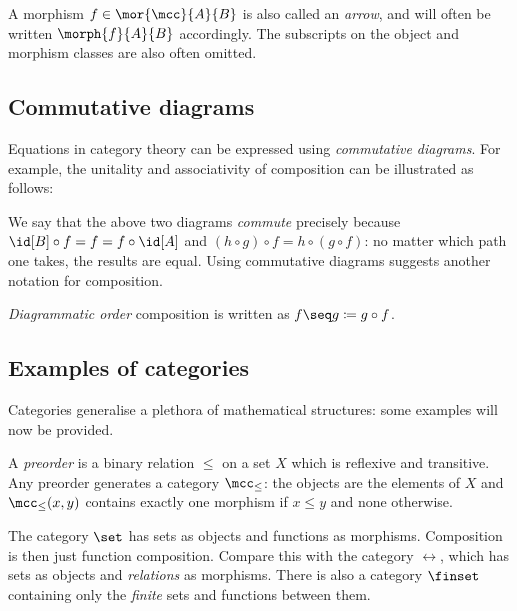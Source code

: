 A morphism \(f \in \mor{\mcc}{A}{B}\) is also called an \emph{arrow}, and will
often be written \(\morph{f}{A}{B}\) accordingly.
The subscripts on the object and morphism classes are also often omitted.

\subsection{Commutative diagrams}

Equations in category theory can be expressed using \emph{commutative diagrams}.
For example, the unitality and associativity of composition can be illustrated
as follows:

\begin{center}
    
    \quad
    
\end{center}

We say that the above two diagrams \emph{commute} precisely because \(
    \id[B] \circ f = f = f \circ \id[A]
\) and \((h \circ g) \circ f = h \circ (g \circ f)\): no matter which path one
takes, the results are equal.
Using commutative diagrams suggests another notation for composition.

\begin{notation}
    \emph{Diagrammatic order} composition is written as
    \(f \seq g \coloneqq g \circ f\).
\end{notation}

\subsection{Examples of categories}

Categories generalise a plethora of mathematical structures: some examples will
now be provided.

\begin{example}[Preorder]
    A \emph{preorder} is a binary relation \(\leq\) on a set \(X\) which is
    reflexive and transitive.
    Any preorder generates a category \(\mcc_\leq\): the objects are the
    elements of \(X\) and \(\mcc_\leq(x, y)\) contains exactly one morphism if
    \(x \leq y\) and none otherwise.
\end{example}

\begin{example}[Sets]
    The category \(\set\) has sets as objects and functions as morphisms.
    Composition is then just function composition.
    Compare this with the category \(\rel\), which has sets as objects and
    \emph{relations} as morphisms.
    There is also a category \(\finset\) containing only the \emph{finite} sets
    and functions between them.
\end{example}

